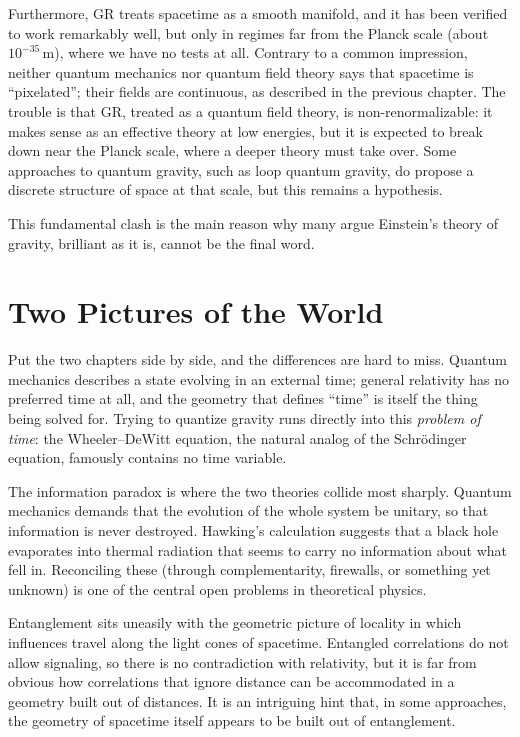 Furthermore, GR treats spacetime as a smooth manifold, and it has been verified to work remarkably well, but only in regimes far from the Planck scale (about $10^{-35}\,\mathrm{m}$), where we have no tests at all.
Contrary to a common impression, neither quantum mechanics nor quantum field theory says that spacetime is ``pixelated''; their fields are continuous, as described in the previous chapter.
The trouble is that GR, treated as a quantum field theory, is non-renormalizable: it makes sense as an effective theory at low energies, but it is expected to break down near the Planck scale, where a deeper theory must take over.
Some approaches to quantum gravity, such as loop quantum gravity, do propose a discrete structure of space at that scale, but this remains a hypothesis.

This fundamental clash is the main reason why many argue Einstein's theory of gravity, brilliant as it is, cannot be the final word.


\section*{Two Pictures of the World}

Put the two chapters side by side, and the differences are hard to miss.
Quantum mechanics describes a state evolving in an external time; general relativity has no preferred time at all, and the geometry that defines ``time'' is itself the thing being solved for.
Trying to quantize gravity runs directly into this \emph{problem of time}: the Wheeler--DeWitt equation, the natural analog of the Schr\"odinger equation, famously contains no time variable.

The information paradox is where the two theories collide most sharply.
Quantum mechanics demands that the evolution of the whole system be unitary, so that information is never destroyed.
Hawking's calculation suggests that a black hole evaporates into thermal radiation that seems to carry no information about what fell in.
Reconciling these (through complementarity, firewalls, or something yet unknown) is one of the central open problems in theoretical physics.

Entanglement sits uneasily with the geometric picture of locality in which influences travel along the light cones of spacetime.
Entangled correlations do not allow signaling, so there is no contradiction with relativity, but it is far from obvious how correlations that ignore distance can be accommodated in a geometry built out of distances.
It is an intriguing hint that, in some approaches, the geometry of spacetime itself appears to be built out of entanglement.

